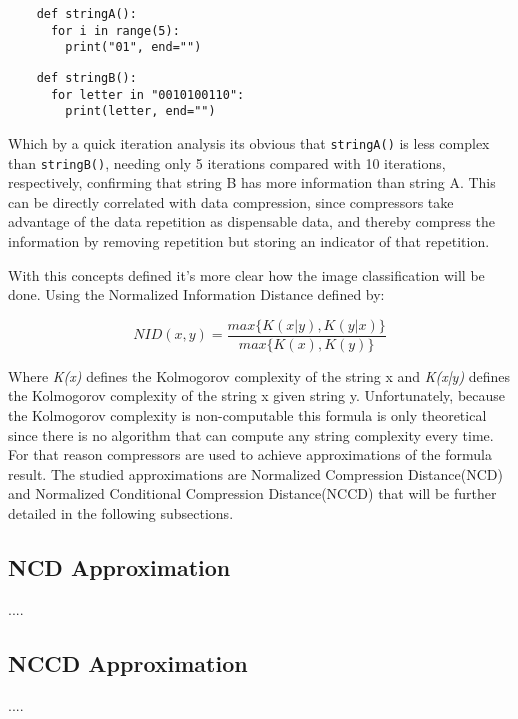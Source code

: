 \documentclass[12pt]{article}
\begin{document}
\vspace{0.2in}
\begin{minipage}{0.45\textwidth}
  \begin{verbatim}
    def stringA():
      for i in range(5):
        print("01", end="")
  \end{verbatim}
\end{minipage}
\begin{minipage}{0.45\textwidth}
  \begin{verbatim}
    def stringB():
      for letter in "0010100110":
        print(letter, end="")
  \end{verbatim}
\end{minipage}
\vspace{0.2in}

Which by a quick iteration analysis its obvious that \texttt{stringA()} is less complex than \texttt{stringB()}, needing only 5 iterations compared with 10 iterations, respectively, confirming that string B has more information than string A. This can be directly correlated with data compression, since compressors take advantage of the data repetition as dispensable data, and thereby compress the information by removing repetition but storing an indicator of that repetition.

With this concepts defined it's more clear how the image classification will be done. Using the Normalized Information Distance defined by:

\begin{equation}
  NID(x,y) = \frac{max\{K(x|y),K(y|x)\}}{max\{K(x),K(y)\}}
\end{equation}

Where \textit{K(x)} defines the Kolmogorov complexity of the string x and \textit{K(x|y)} defines the Kolmogorov complexity of the string x given string y. Unfortunately, because the Kolmogorov complexity is non-computable this formula is only theoretical since there is no algorithm that can compute any string complexity every time. For that reason compressors are used to achieve approximations of the formula result. The studied approximations are Normalized Compression Distance(NCD) and Normalized Conditional Compression Distance(NCCD) that will be further detailed in the following subsections.

\subsection{NCD Approximation}
....

\subsection{NCCD Approximation}
....
\end{document}
